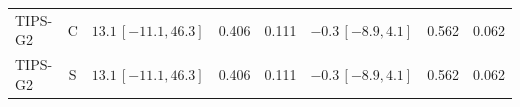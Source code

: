 \documentclass[10pt,a4paper]{article}
\begin{document}
\begin{longtable}{lcp{37mm}rrp{37mm}rr}
TIPS-G2 & C & \(13.1\,[-11.1,46.3]\) & 0.406 & 0.111 & \(-0.3\,[-8.9,4.1]\) & 0.562 & 0.062\\
TIPS-G2 & S & \(13.1\,[-11.1,46.3]\) & 0.406 & 0.111 & \(-0.3\,[-8.9,4.1]\) & 0.562 & 0.062\\

\end{longtable}
\end{document}
